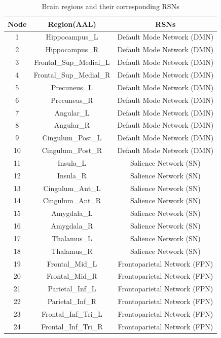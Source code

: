 \documentclass[12pt,technote,onecolumn]{IEEEtran}
\begin{document}
\begin{table}[htbp]
\centering
\caption{Brain regions and their corresponding RSNs}
\begin{tabular}{ccc}
\toprule
\textbf{Node} & \textbf{Region(AAL)} & \textbf{RSNs} \\
\midrule
1  & Hippocampus\_L        & Default Mode Network (DMN) \\
2  & Hippocampus\_R        & Default Mode Network (DMN) \\
3  & Frontal\_Sup\_Medial\_L & Default Mode Network (DMN) \\
4  & Frontal\_Sup\_Medial\_R & Default Mode Network (DMN) \\
5  & Precuneus\_L          & Default Mode Network (DMN) \\
6  & Precuneus\_R          & Default Mode Network (DMN) \\
7  & Angular\_L            & Default Mode Network (DMN) \\
8  & Angular\_R            & Default Mode Network (DMN) \\
9  & Cingulum\_Post\_L     & Default Mode Network (DMN) \\
10 & Cingulum\_Post\_R     & Default Mode Network (DMN) \\
11 & Insula\_L             & Salience Network (SN) \\
12 & Insula\_R             & Salience Network (SN) \\
13 & Cingulum\_Ant\_L      & Salience Network (SN) \\
14 & Cingulum\_Ant\_R      & Salience Network (SN) \\
15 & Amygdala\_L           & Salience Network (SN) \\
16 & Amygdala\_R           & Salience Network (SN) \\
17 & Thalamus\_L           & Salience Network (SN) \\
18 & Thalamus\_R           & Salience Network (SN) \\
19 & Frontal\_Mid\_L       & Frontoparietal Network (FPN) \\
20 & Frontal\_Mid\_R       & Frontoparietal Network (FPN) \\
21 & Parietal\_Inf\_L      & Frontoparietal Network (FPN) \\
22 & Parietal\_Inf\_R      & Frontoparietal Network (FPN) \\
23 & Frontal\_Inf\_Tri\_L  & Frontoparietal Network (FPN) \\
24 & Frontal\_Inf\_Tri\_R  & Frontoparietal Network (FPN) \\

\end{tabular}
\end{table}
\end{document}

